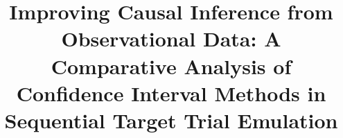 \documentclass[pdflatex,sn-vancouver-ay]{sn-jnl}%
\theoremstyle{thmstyleone}%
\theoremstyle{thmstyletwo}%
\theoremstyle{thmstylethree}%
\begin{document}
\title[Article Title]{Improving Causal Inference from Observational Data: A Comparative Analysis of Confidence Interval Methods in Sequential Target Trial Emulation}


\author[1]{ }

\author{ }

\author{ }






\end{document}
